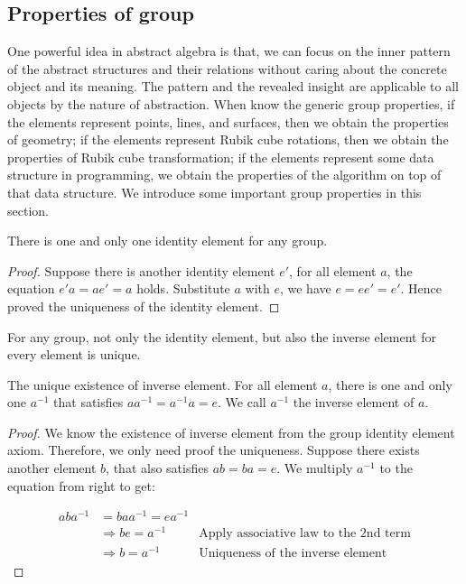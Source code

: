 \documentclass{article}
\begin{document}
\subsection{Properties of group}

One powerful idea in abstract algebra is that, we can focus on the inner pattern of the abstract structures and their relations without caring about the concrete object and its meaning. The pattern and the revealed insight are applicable to all objects by the nature of abstraction. When know the generic group properties, if the elements represent points, lines, and surfaces, then we obtain the properties of geometry; if the elements represent Rubik cube rotations, then we obtain the properties of Rubik cube transformation; if the elements represent some data structure in programming, we obtain the properties of the algorithm on top of that data structure. We introduce some important group properties in this section.

\begin{theorem}
There is one and only one identity element for any group.
\end{theorem}

\begin{proof}
Suppose there is another identity element $e'$, for all element $a$, the equation $e'a = ae' = a$ holds. Substitute $a$ with $e$, we have $e = ee'= e'$. Hence proved the uniqueness of the identity element.
\end{proof}

For any group, not only the identity element, but also the inverse element for every element is unique.

\begin{theorem}
The unique existence of inverse element. For all element $a$, there is one and only one $a^{-1}$ that satisfies $aa^{-1} = a^{-1}a = e$. We call $a^{-1}$ the inverse element of $a$.
\end{theorem}

\begin{proof}
We know the existence of inverse element from the group identity element axiom. Therefore, we only need proof the uniqueness. Suppose there exists another element $b$, that also satisfies $ab = ba = e$. We multiply $a^{-1}$ to the equation from right to get:

\[
\begin{array}{rll}
aba^{-1} & = baa^{-1} = ea^{-1} & \\
& \Rightarrow be = a^{-1} & \text{Apply associative law to the 2nd term} \\
& \Rightarrow b = a^{-1} & \text{Uniqueness of the inverse element}
\end{array}
\]
\end{proof}
\end{document}
